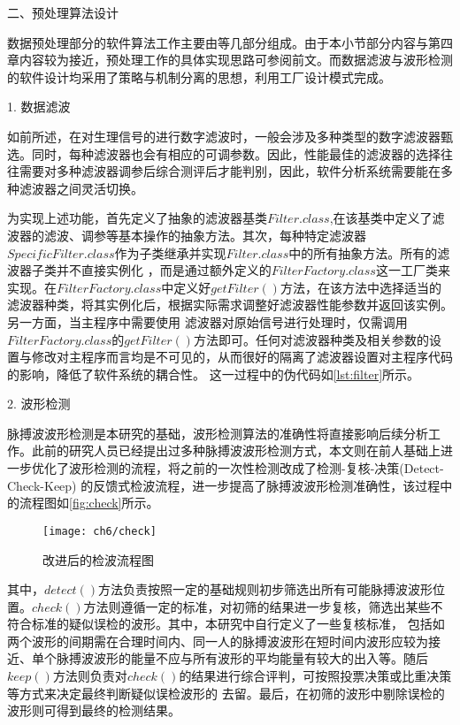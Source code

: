 二、预处理算法设计

数据预处理部分的软件算法工作主要由等几部分组成。由于本小节部分内容与第四章内容较为接近，预处理工作的具体实现思路可参阅前文。而数据滤波与波形检测的软件设计均采用了策略与机制分离的思想，利用工厂设计模式\cite{Enrich2018}完成。

1. 数据滤波

如前所述，在对生理信号的进行数字滤波时，一般会涉及多种类型的数字滤波器甄选。同时，每种滤波器也会有相应的可调参数。因此，性能最佳的滤波器的选择往往需要对多种滤波器调参后综合测评后才能判别，因此，软件分析系统需要能在多种滤波器之间灵活切换。

为实现上述功能，首先定义了抽象的滤波器基类$Filter.class$,在该基类中定义了滤波器的滤波、调参等基本操作的抽象方法。其次，每种特定滤波器$SpecificFilter.class$作为子类继承并实现$Filter.class$中的所有抽象方法。所有的滤波器子类并不直接实例化
，而是通过额外定义的$FilterFactory.class$这一工厂类来实现。在$FilterFactory.class$中定义好$getFilter()$方法，在该方法中选择适当的滤波器种类，将其实例化后，根据实际需求调整好滤波器性能参数并返回该实例。另一方面，当主程序中需要使用
滤波器对原始信号进行处理时，仅需调用$FilterFactory.class$的$getFilter()$方法即可。任何对滤波器种类及相关参数的设置与修改对主程序而言均是不可见的，从而很好的隔离了滤波器设置对主程序代码的影响，降低了软件系统的耦合性。
这一过程中的伪代码如\autoref{lst:filter}所示。


2. 波形检测

脉搏波波形检测是本研究的基础，波形检测算法的准确性将直接影响后续分析工作。此前的研究人员已经提出过多种脉搏波波形检测方式\cite{Wang2012}，本文则在前人基础上进一步优化了波形检测的流程，将之前的一次性检测改成了检测-复核-决策(Detect-Check-Keep)
的反馈式检波流程，进一步提高了脉搏波波形检测准确性，该过程中的流程图如\autoref{fig:check}所示。
\begin{figure}[htbp]
    \centering
    \texttt{[image: ch6/check]}
    \caption{\label{fig:check}改进后的检波流程图}
\end{figure}

其中，$detect()$方法负责按照一定的基础规则初步筛选出所有可能脉搏波波形位置。$check()$方法则遵循一定的标准，对初筛的结果进一步复核，筛选出某些不符合标准的疑似误检的波形。其中，本研究中自行定义了一些复核标准，
包括如两个波形的间期需在合理时间内、同一人的脉搏波波形在短时间内波形应较为接近、单个脉搏波波形的能量不应与所有波形的平均能量有较大的出入等。随后$keep()$方法则负责对$check()$的结果进行综合评判，可按照投票决策或比重决策等方式来决定最终判断疑似误检波形的
去留。最后，在初筛的波形中剔除误检的波形则可得到最终的检测结果。

